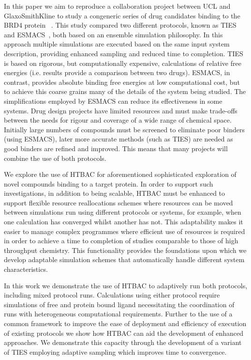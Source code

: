 In this paper we aim to reproduce a collaboration project between UCL and
GlaxoSmithKline to study a congeneric series of drug candidates binding to the
BRD4 protein 
~\cite{Wan2017brd4}. This
study compared two different protocols, known as TIES and
ESMACS~\cite{Wan2017brd4, Bhati2017}, both based on an ensemble simulation
philosophy. In this approach multiple simulations are executed based on the
same input system description, providing enhanced sampling and reduced time to
completion. TIES is based on rigorous, but computationally expensive,
calculations of relative free energies (i.e. results provide a comparison
between two drugs). ESMACS, in contrast, provides absolute binding free
energies at low computational cost, but to achieve this coarse grains many of
the details of the system being studied. The simplifications employed by
ESMACS can reduce its effectiveness in some systems. 
Drug design projects have limited resources
and must make trade-offs between the needs for rigour and coverage of a wide
range of chemical space. Initially large numbers of compounds must be screened
to eliminate poor binders (using ESMACS), later more accurate methods (such as
TIES) are needed as good binders are refined and improved. This means that
many projects will combine the use of both protocols.

We explore the use of HTBAC for aforementioned sophisticated exploration of
novel compounds binding to a target protein. In order to support such
investigations, in addition to being scalable, HTBAC must be enhanced to
support flexible resource reallocations schemes where resources can be moved
between simulations run using different protocols or systems, for example,
when one calculation has converged whilst another has not. This adaptability
makes it easier to manage complex programmes where efficient use of resources
is required in order to achieve a time to completion of studies comparable to
those of high throughput chemistry. 
This functionality provides the
foundations upon which we develop adaptable simulation schemes that
automatically handle different system characteristics.

In this work we demonstrate the use of HTBAC to adaptively run both protocols,
including mixed protocol runs. 
Calculations using either protocol require simulations of free and 
protein bound ligand necessitating the coordination of runs with 
heterogeneous computational requirements.
Further to the use of a common framework to improve the ease of deployment and
efficiency of execution of existing protocols we show how HTBAC can aid the
development of enhanced approaches. 
We demonstrate this capacity through the development of a variant of TIES 
employing adaptive sampling which improves time to convergence.

